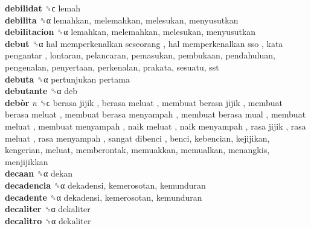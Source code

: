 \textbf{debilidat} ␝ϲ  lemah  \\
\textbf{debilita} ␝α  lemahkan, melemahkan, melesukan, menyusutkan  \\
\textbf{debilitacion} ␝α  lemahkan, melemahkan, melesukan, menyusutkan  \\
\textbf{debut} ␝α   hal memperkenalkan seseorang ,  hal memperkenalkan sso ,  kata pengantar , lontaran, pelancaran, pemasukan, pembukaan, pendahuluan, pengenalan, penyertaan, perkenalan, prakata, sesuatu, sst  \\
\textbf{debuta} ␝α   pertunjukan pertama   \\
\textbf{debutante} ␝α  deb  \\
\textbf{debòr} \emph{n}  ␝ϲ   berasa jijik ,  berasa meluat ,  membuat berasa jijik ,  membuat berasa meluat ,  membuat berasa menyampah ,  membuat berasa mual ,  membuat meluat ,  membuat menyampah ,  naik meluat ,  naik menyampah ,  rasa jijik ,  rasa meluat ,  rasa menyampah ,  sangat dibenci , benci, kebencian, kejijikan, kengerian, meluat, memberontak, memuakkan, memualkan, menangkis, menjijikkan  \\
\textbf{decaan} ␝α  dekan  \\
\textbf{decadencia} ␝α  dekadensi, kemerosotan, kemunduran  \\
\textbf{decadente} ␝α  dekadensi, kemerosotan, kemunduran  \\
\textbf{decaliter} ␝α  dekaliter  \\
\textbf{decalitro} ␝α  dekaliter  \\
